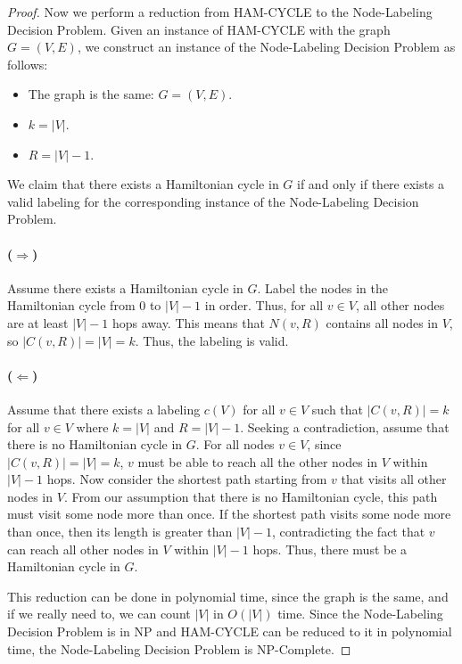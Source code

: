 \documentclass{article}
\begin{document}
\begin{proof}
    Now we perform a reduction from HAM-CYCLE to the Node-Labeling Decision Problem.
    Given an instance of HAM-CYCLE with the graph $G = (V, E)$, we construct an instance of the Node-Labeling Decision Problem as follows:
    \begin{itemize}
        \item The graph is the same: $G = (V, E)$.
        \item $k = |V|$.
        \item $R = |V| - 1$.
    \end{itemize}
    We claim that there exists a Hamiltonian cycle in $G$ if and only if there exists a valid labeling for the corresponding instance of the Node-Labeling Decision Problem.
    \paragraph{($\Rightarrow$)} Assume there exists a Hamiltonian cycle in $G$.
    Label the nodes in the Hamiltonian cycle from $0$ to $|V| - 1$ in order.
    Thus, for all $v \in V$, all other nodes are at least $|V| - 1$ hops away.
    This means that $N(v, R)$ contains all nodes in $V$, so $|C(v, R)| = |V| = k$.
    Thus, the labeling is valid.
    \paragraph{($\Leftarrow$)} Assume that there exists a labeling $c(V)$ for all $v \in V$ such that $|C(v, R)| = k$ for all $v \in V$ where $k = |V|$ and $R = |V| - 1$.
    Seeking a contradiction, assume that there is no Hamiltonian cycle in $G$.
    For all nodes $v \in V$, since $|C(v, R)| = |V| = k$, $v$ must be able to reach all the other nodes in $V$ within $|V| - 1$ hops.
    Now consider the shortest path starting from $v$ that visits all other nodes in $V$.
    From our assumption that there is no Hamiltonian cycle, this path must visit some node more than once.
    If the shortest path visits some node more than once, then its length is greater than $|V| - 1$, contradicting the fact that $v$ can reach all other nodes in $V$ within $|V| - 1$ hops.
    Thus, there must be a Hamiltonian cycle in $G$.
    
    \vspace{1em}
    This reduction can be done in polynomial time, since the graph is the same, and if we really need to, we can count $|V|$ in $O(|V|)$ time.
    Since the Node-Labeling Decision Problem is in NP and HAM-CYCLE can be reduced to it in polynomial time, the Node-Labeling Decision Problem is NP-Complete.
\end{proof}
\end{document}
